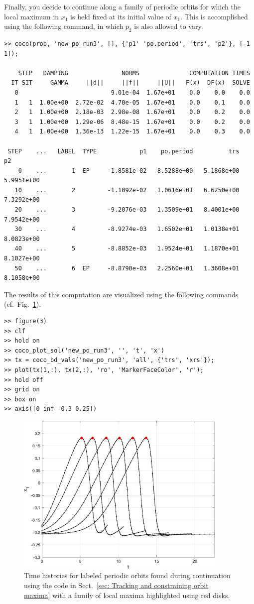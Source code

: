 Finally, you decide to continue along a family of periodic orbits for which the local maximum in $x_1$ is held fixed at its initial value of $x_1$. This is accomplished using the following command, in which $p_2$ is also allowed to vary.
\begin{lstlisting}[language=coco-highlight,frame=lines]
>> coco(prob, 'new_po_run3', [], {'p1' 'po.period', 'trs', 'p2'}, [-1 1]);

    STEP   DAMPING               NORMS              COMPUTATION TIMES
  IT SIT     GAMMA     ||d||     ||f||     ||U||   F(x)  DF(x)  SOLVE
   0                          9.01e-04  1.67e+01    0.0    0.0    0.0
   1   1  1.00e+00  2.72e-02  4.70e-05  1.67e+01    0.0    0.1    0.0
   2   1  1.00e+00  2.18e-03  2.98e-08  1.67e+01    0.0    0.2    0.0
   3   1  1.00e+00  1.29e-06  8.48e-15  1.67e+01    0.0    0.2    0.0
   4   1  1.00e+00  1.36e-13  1.22e-15  1.67e+01    0.0    0.3    0.0

 STEP    ...   LABEL  TYPE            p1    po.period          trs           p2
    0    ...       1  EP     -1.8581e-02   8.5288e+00   5.1868e+00   5.9951e+00
   10    ...       2         -1.1092e-02   1.0616e+01   6.6250e+00   7.3292e+00
   20    ...       3         -9.2076e-03   1.3509e+01   8.4001e+00   7.9542e+00
   30    ...       4         -8.9274e-03   1.6502e+01   1.0138e+01   8.0823e+00
   40    ...       5         -8.8852e-03   1.9524e+01   1.1870e+01   8.1027e+00
   50    ...       6  EP     -8.8790e-03   2.2560e+01   1.3608e+01   8.1058e+00
\end{lstlisting}
The results of this computation are visualized using the following commands (cf.\ Fig.~\ref{fig: Section7_4_4}).
\begin{lstlisting}[language=coco-highlight,frame=lines]
>> figure(3)
>> clf
>> hold on
>> coco_plot_sol('new_po_run3', '', 't', 'x')
>> tx = coco_bd_vals('new_po_run3', 'all', {'trs', 'xrs'});
>> plot(tx(1,:), tx(2,:), 'ro', 'MarkerFaceColor', 'r');
>> hold off
>> grid on
>> box on
>> axis([0 inf -0.3 0.25])
\end{lstlisting}
\begin{figure}[h]
\centering
\includegraphics[width=4in]{Figures/Section7_4_4.jpg}
\caption{Time histories for labeled periodic orbits found during continuation using the code in Sect.~\ref{sec: Tracking and constraining orbit maxima} with a family of local maxima highlighted using red disks.}
\label{fig: Section7_4_4}
\end{figure}

